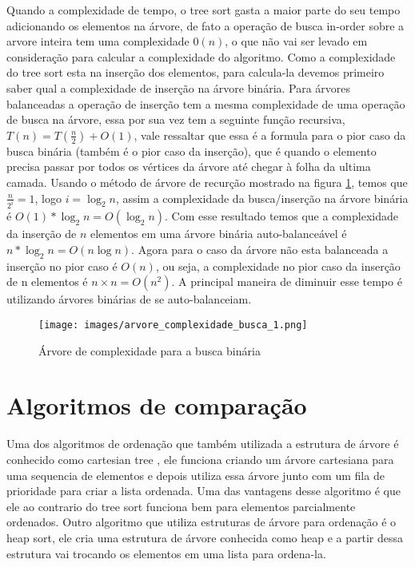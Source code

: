 \documentclass[12pt]{article}
\begin{document}
Quando a complexidade de tempo, o tree sort gasta a maior parte do seu tempo adicionando os elementos na árvore, de fato a operação de busca in-order sobre a arvore inteira tem uma complexidade $0(n)$, o que não vai ser levado em consideração para calcular a complexidade do algoritmo. Como a complexidade do tree sort esta na inserção dos elementos, para calcula-la devemos primeiro saber qual a complexidade de inserção na árvore binária. Para árvores balanceadas a operação de inserção tem a mesma complexidade de uma operação de busca na árvore, essa por sua vez tem a seguinte função recursiva, $T(n) = T(\frac{n}{2}) + O(1)$, vale ressaltar que essa é a formula para o pior caso da busca binária (também é o pior caso da inserção), que é quando o elemento precisa passar por todos os vértices da árvore até chegar à folha da ultima camada. Usando o método de árvore de recurção mostrado na figura \ref{fig:arvore_complexidade_busca}, temos que $\frac{n}{2^i} = 1$, logo $i = \log_2{n}$, assim a complexidade da busca/inserção na árvore binária é $O(1) * \log_2{n} = O(\log_2{n})$. Com esse resultado temos que a complexidade da inserção de $n$ elementos em uma árvore binária auto-balanceável é $n * \log_2{n} = O(n\log{}n)$. Agora para o caso da árvore não esta balanceada a inserção no pior caso é $O(n)$, ou seja, a complexidade no pior caso da inserção de n elementos é $n \times n = O(n^2)$. A principal maneira de diminuir esse tempo é utilizando árvores binárias de se auto-balanceiam.

\begin{figure}[ht]
\centering
\texttt{[image: images/arvore\_complexidade\_busca\_1.png]}
\caption{Árvore de complexidade para a busca binária}
\label{fig:arvore_complexidade_busca}
\end{figure}

\section{Algoritmos de comparação}
\label{sec:other_algorithms}

Uma dos algoritmos de ordenação que também utilizada a estrutura de árvore é conhecido como cartesian tree \cite{demaine2009cartesian}, ele funciona criando um árvore cartesiana para uma sequencia de elementos e depois utiliza essa árvore junto com um fila de prioridade para criar a lista ordenada. Uma das vantagens desse algoritmo é que ele ao contrario do tree sort funciona bem para elementos parcialmente ordenados. Outro algoritmo que utiliza estruturas de árvore para ordenação é o heap sort, ele cria uma estrutura de árvore conhecida como heap e a partir dessa estrutura vai trocando os elementos em uma lista para ordena-la.
\end{document}
